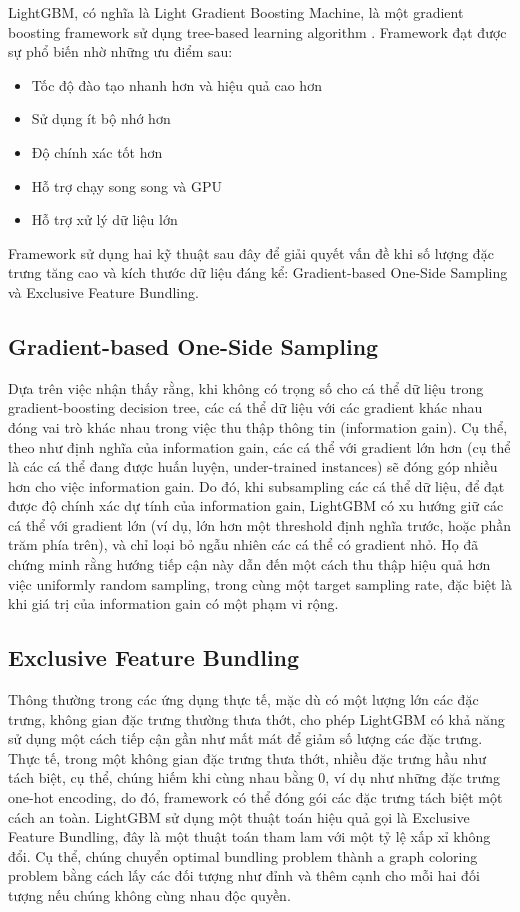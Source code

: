 LightGBM, có nghĩa là Light Gradient Boosting Machine, là một gradient boosting framework sử dụng tree-based learning algorithm \cite{ke2017lightgbm}. Framework đạt được sự phổ biến nhờ những ưu điểm sau:

\begin{itemize}
\item Tốc độ đào tạo nhanh hơn và hiệu quả cao hơn
\item Sử dụng ít bộ nhớ hơn
\item Độ chính xác tốt hơn
\item Hỗ trợ chạy song song và GPU
\item Hỗ trợ xử lý dữ liệu lớn
\end{itemize}

Framework sử dụng hai kỹ thuật sau đây để giải quyết vấn đề khi số lượng đặc trưng tăng cao và kích thước dữ liệu đáng kể: Gradient-based One-Side Sampling và Exclusive Feature Bundling.

\subsection{Gradient-based One-Side Sampling}

Dựa trên việc nhận thấy rằng, khi không có trọng số cho cá thể dữ liệu trong gradient-boosting decision tree, các cá thể dữ liệu với các gradient khác nhau đóng vai trò khác nhau trong việc thu thập thông tin (information gain).
Cụ thể, theo như định nghĩa của information gain, các cá thể với gradient lớn hơn (cụ thể là các cá thể đang được huấn luyện, under-trained instances) sẽ đóng góp nhiều hơn cho việc information gain.
Do đó, khi subsampling các cá thể dữ liệu, để đạt được độ chính xác dự tính của information gain, LightGBM có xu hướng giữ các cá thể với gradient lớn (ví dụ, lớn hơn một threshold định nghĩa trước, hoặc phần trăm phía trên), và chỉ loại bỏ ngẫu nhiên các cá thể có gradient nhỏ.
Họ đã chứng minh rằng hướng tiếp cận này dẫn đến một cách thu thập hiệu quả hơn việc uniformly random sampling, trong cùng một target sampling rate, đặc biệt là khi giá trị của information gain có một phạm vi rộng.

\subsection{Exclusive Feature Bundling}

Thông thường trong các ứng dụng thực tế, mặc dù có một lượng lớn các đặc trưng, không gian đặc trưng thường thưa thớt, cho phép LightGBM có khả năng sử dụng một cách tiếp cận gần như mất mát để giảm số lượng các đặc trưng.
Thực tế, trong một không gian đặc trưng thưa thớt, nhiều đặc trưng hầu như tách biệt, cụ thể, chúng hiếm khi cùng nhau bằng 0, ví dụ như những đặc trưng one-hot encoding, do đó, framework có thể đóng gói các đặc trưng tách biệt một cách an toàn.
LightGBM sử dụng một thuật toán hiệu quả gọi là Exclusive Feature Bundling, đây là một thuật toán tham lam với một tỷ lệ xấp xỉ không đổi.
Cụ thể, chúng chuyển optimal bundling problem thành a graph coloring problem bằng cách lấy các đối tượng như đỉnh và thêm cạnh cho mỗi hai đối tượng nếu chúng không cùng nhau độc quyền.
